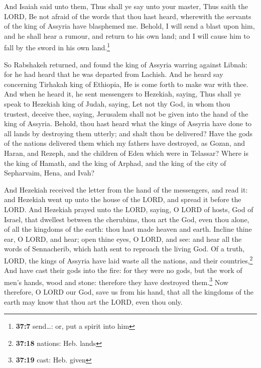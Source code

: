  And Isaiah said unto them, Thus shall ye say unto your
master, Thus saith the LORD, Be not afraid of the words that thou hast
heard, wherewith the servants of the king of Assyria have blasphemed me.
 Behold, I will send a blast upon him, and he shall hear a
rumour, and return to his own land; and I will cause him to fall by the
sword in his own land.\footnote{\textbf{37:7} send\ldots: or, put a
  spirit into him}

 So Rabshakeh returned, and found the king of Assyria
warring against Libnah: for he had heard that he was departed from
Lachish.  And he heard say concerning Tirhakah king of
Ethiopia, He is come forth to make war with thee. And when he heard it,
he sent messengers to Hezekiah, saying,  Thus shall ye
speak to Hezekiah king of Judah, saying, Let not thy God, in whom thou
trustest, deceive thee, saying, Jerusalem shall not be given into the
hand of the king of Assyria.  Behold, thou hast heard
what the kings of Assyria have done to all lands by destroying them
utterly; and shalt thou be delivered?  Have the gods of
the nations delivered them which my fathers have destroyed, as Gozan,
and Haran, and Rezeph, and the children of Eden which were in Telassar?
 Where is the king of Hamath, and the king of Arphad, and
the king of the city of Sepharvaim, Hena, and Ivah?

 And Hezekiah received the letter from the hand of the
messengers, and read it: and Hezekiah went up unto the house of the
LORD, and spread it before the LORD.  And Hezekiah prayed
unto the LORD, saying,  O LORD of hosts, God of Israel,
that dwellest between the cherubims, thou art the God, even thou alone,
of all the kingdoms of the earth: thou hast made heaven and earth.
 Incline thine ear, O LORD, and hear; open thine eyes, O
LORD, and see: and hear all the words of Sennacherib, which hath sent to
reproach the living God.  Of a truth, LORD, the kings of
Assyria have laid waste all the nations, and their countries,\footnote{\textbf{37:18}
  nations: Heb. lands}  And have cast their gods into the
fire: for they were no gods, but the work of men's hands, wood and
stone: therefore they have destroyed them.\footnote{\textbf{37:19} cast:
  Heb. given}  Now therefore, O LORD our God, save us
from his hand, that all the kingdoms of the earth may know that thou art
the LORD, even thou only.

